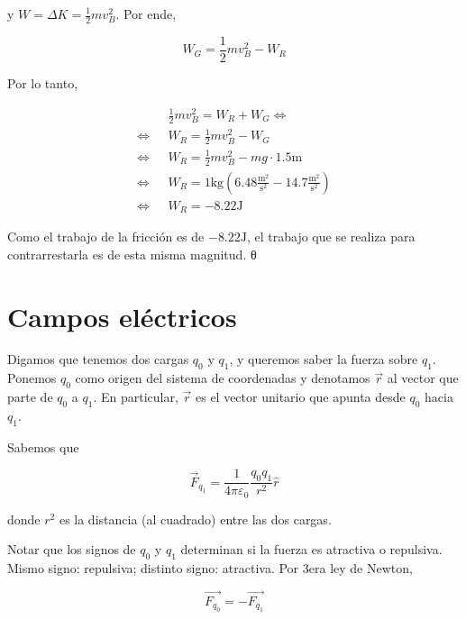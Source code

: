 \documentclass[12pt]{article}
\theoremstyle{definition}
\begin{document}
y $W = \Delta K = \frac{1}{2}mv_B^2$. Por ende, 

\begin{equation*}
    W_G = \frac{1}{2}mv_B^2 - W_R
\end{equation*}

Por lo tanto, 

\begin{align*}
    &\frac{1}{2}mv_B^2  = W_R + W_G \iff \\ 
    \iff ~ ~ ~ 
    &W_R = \frac{1}{2}mv_B^2 - W_G\\ 
    \iff ~ ~ ~ 
    &W_R = \frac{1}{2}mv_B^2 - mg \cdot 1.5\text{m} \\ 
    \iff ~ ~ ~  
    &W_R = \text{1kg}\left( 6.48 \frac{\text{m}^2}{\text{s}^2} - 14.7
    \frac{\text{m}^2}{\text{s}^2} \right) \\ 
    \iff &W_R = -8.22\text{J}
\end{align*}

Como el trabajo de la fricción es de $-8.22\text{J}$, el trabajo que se realiza
para contrarrestarla es de esta misma magnitud. θ


\pagebreak 

\section{Campos eléctricos}

Digamos que tenemos dos cargas $q_0$ y $q_1$, y queremos saber la fuerza sobre
$q_1$.
Ponemos $q_0$ como origen del sistema de coordenadas y denotamos $\vec{r}$ al
vector que parte de $q_0$ a $q_1$. En particular, $\vec{r}$ es el vector unitario
que apunta desde $q_0$ hacia $q_1$.

Sabemos que 

\begin{equation*}
    \vec{F}_{q_1} = \frac{1}{4 \pi \varepsilon_0 } \frac{q_0 q_1}{r^2}\hat{r}
\end{equation*}

donde $r^2$ es la distancia (al cuadrado) entre las dos cargas.

Notar que los signos de $q_0$ y $q_1$ determinan si la fuerza es atractiva o
repulsiva. Mismo signo: repulsiva; distinto signo: atractiva. Por 3era ley de
Newton, 

\begin{equation*}
    \vec{F_{ q_0 }} = -\vec{F_{q_1}}
\end{equation*}
\end{document}
